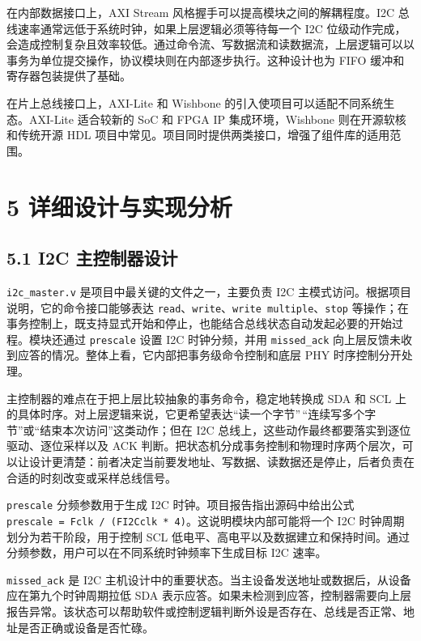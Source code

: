 在内部数据接口上，AXI Stream 风格握手可以提高模块之间的解耦程度。I2C 总线速率通常远低于系统时钟，如果上层逻辑必须等待每一个 I2C 位级动作完成，会造成控制复杂且效率较低。通过命令流、写数据流和读数据流，上层逻辑可以以事务为单位提交操作，协议模块则在内部逐步执行。这种设计也为 FIFO 缓冲和寄存器包装提供了基础。

在片上总线接口上，AXI-Lite 和 Wishbone 的引入使项目可以适配不同系统生态。AXI-Lite 适合较新的 SoC 和 FPGA IP 集成环境，Wishbone 则在开源软核和传统开源 HDL 项目中常见。项目同时提供两类接口，增强了组件库的适用范围。

\section{5 详细设计与实现分析}\label{ux8be6ux7ec6ux8bbeux8ba1ux4e0eux5b9eux73b0ux5206ux6790}

\subsection{5.1 I2C 主控制器设计}\label{i2c-ux4e3bux63a7ux5236ux5668ux8bbeux8ba1}

\texttt{i2c\_master.v} 是项目中最关键的文件之一，主要负责 I2C 主模式访问。根据项目说明，它的命令接口能够表达 \texttt{read}、\texttt{write}、\texttt{write\ multiple}、\texttt{stop} 等操作；在事务控制上，既支持显式开始和停止，也能结合总线状态自动发起必要的开始过程。模块还通过 \texttt{prescale} 设置 I2C 时钟分频，并用 \texttt{missed\_ack} 向上层反馈未收到应答的情况。整体上看，它内部把事务级命令控制和底层 PHY 时序控制分开处理。

主控制器的难点在于把上层比较抽象的事务命令，稳定地转换成 SDA 和 SCL 上的具体时序。对上层逻辑来说，它更希望表达``读一个字节''\,``连续写多个字节''或``结束本次访问''这类动作；但在 I2C 总线上，这些动作最终都要落实到逐位驱动、逐位采样以及 ACK 判断。把状态机分成事务控制和物理时序两个层次，可以让设计更清楚：前者决定当前要发地址、写数据、读数据还是停止，后者负责在合适的时刻改变或采样总线信号。

\texttt{prescale} 分频参数用于生成 I2C 时钟。项目报告指出源码中给出公式 \texttt{prescale\ =\ Fclk\ /\ (FI2Cclk\ *\ 4)}。这说明模块内部可能将一个 I2C 时钟周期划分为若干阶段，用于控制 SCL 低电平、高电平以及数据建立和保持时间。通过分频参数，用户可以在不同系统时钟频率下生成目标 I2C 速率。

\texttt{missed\_ack} 是 I2C 主机设计中的重要状态。当主设备发送地址或数据后，从设备应在第九个时钟周期拉低 SDA 表示应答。如果未检测到应答，控制器需要向上层报告异常。该状态可以帮助软件或控制逻辑判断外设是否存在、总线是否正常、地址是否正确或设备是否忙碌。

